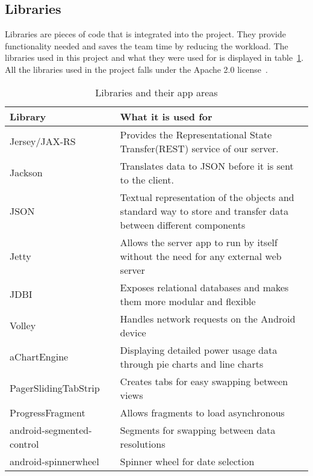 \subsection{Libraries}
\label{sec:libraries}
Libraries are pieces of code that is integrated into the project. They provide functionality needed and saves the team time by reducing the workload. The libraries used in this project and what they were used for is displayed in table~\ref{tab:libs}.
 All the libraries used in the project falls under the Apache 2.0 license~\cite{apache}.

\begin{table}[H]
\begin{tabular}{|l|p{10.5cm}|}
\hline
\textbf{Library }& \textbf{What it is used for}\\\hline
Jersey/JAX-RS~\cite{jersey} & Provides the Representational State Transfer(REST) service of our server.\\\hline
Jackson~\cite{jackson}&Translates data to JSON before it is sent to the client.\\\hline
JSON~\cite{json}&Textual representation of the objects and standard way to store and transfer data between different components\\\hline
Jetty~\cite{jetty}&Allows the server app to run by itself without the need for any external web server\\\hline
JDBI~\cite{jdbi}&Exposes relational databases and makes them more modular and flexible\\\hline
Volley~\cite{volley}& Handles network requests on the Android device\\\hline
aChartEngine~\cite{achart}& Displaying detailed power usage data through  pie charts and line charts\\\hline
PagerSlidingTabStrip~\cite{psts}& Creates tabs for easy swapping between views\\\hline
ProgressFragment~\cite{progressfragment}& Allows fragments to load asynchronous\\\hline
android-segmented-control~\cite{segments}& Segments for swapping between data resolutions\\\hline
android-spinnerwheel\cite{spinnerwheel}& Spinner wheel for date selection\\\hline
\end{tabular}
\caption{Libraries and their app areas}
\label{tab:libs}
\end{table}

